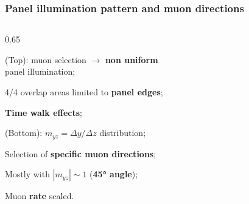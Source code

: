 \documentclass{beamer}
\begin{document}
\begin{frame}
    \frametitle{Panel illumination pattern and muon directions}
    \begin{columns}
\begin{column}{0.65\framewidth}
\vspace{-8mm}
   \setlength{\leftmargini}{1.2em}
      \begin{itemize}
 {\footnotesize
 
\item (Top): muon selection $\rightarrow$ \textbf{non uniform} \\ panel illumination;
 \vspace{6mm}
\item 4/4 overlap areas limited to \textbf{panel edges};
 \vspace{6mm}
\item \textbf{Time walk effects};
 \vspace{6mm}
\item (Bottom): $m_{yz}=\Delta y /\Delta z$ distribution;
 \vspace{6mm}
 \item Selection of \textbf{specific muon directions};
 \vspace{6mm}
\item Mostly with $|m_{yz}| \sim 1$ (\textbf{45° angle});
 \vspace{6mm}
\item Muon \textbf{rate} scaled.}


\end{itemize}
\end{column}
\end{columns}
\end{frame}
\end{document}
